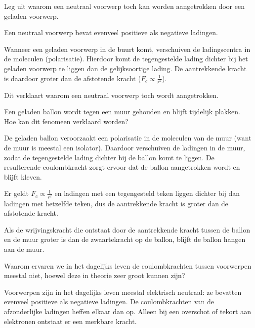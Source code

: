 \documentclass{ximera}
\begin{document}
\begin{question}
    Leg uit waarom een neutraal voorwerp toch kan worden aangetrokken door een geladen voorwerp.

    \begin{solution}\nl
        Een neutraal voorwerp bevat evenveel positieve als negatieve ladingen.

        Wanneer een geladen voorwerp in de buurt komt, verschuiven de ladingscentra in de moleculen (polarisatie). Hierdoor komt de tegengestelde lading dichter bij het geladen voorwerp te liggen dan de gelijksoortige lading. De aantrekkende kracht is daardoor groter dan de afstotende kracht ($F_{c}\propto \tfrac{1}{r^{2}} $).

        Dit verklaart waarom een neutraal voorwerp toch wordt aangetrokken.\\
    \end{solution}
\end{question}

\begin{question}
    Een geladen ballon wordt tegen een muur gehouden en blijft tijdelijk plakken. Hoe kan dit fenomeen verklaard worden?

    \begin{solution}\nl
        De geladen ballon veroorzaakt een polarisatie in de moleculen van de muur (want de muur is meestal een isolator). Daardoor verschuiven de ladingen in de muur, zodat de tegengestelde lading dichter bij de ballon komt te liggen. De resulterende coulombkracht zorgt ervoor dat de ballon aangetrokken wordt en blijft kleven.

        Er geldt $F_{c}\propto \tfrac{1}{r^{2}} $ en ladingen met een tegengesteld teken liggen dichter bij dan ladingen met hetzelfde teken, dus de aantrekkende kracht is groter dan de afstotende kracht.

        Als de wrijvingskracht die ontstaat door de aantrekkende kracht tussen de ballon en de muur groter is dan de zwaartekracht op de ballon, blijft de ballon hangen aan de muur.
    \end{solution}
\end{question}

\begin{question}
    Waarom ervaren we in het dagelijks leven de coulombkrachten tussen voorwerpen meestal niet, hoewel deze in theorie zeer groot kunnen zijn?

    \begin{solution}\nl
        Voorwerpen zijn in het dagelijks leven meestal elektrisch neutraal: ze bevatten evenveel positieve als negatieve ladingen. De coulombkrachten van de afzonderlijke ladingen heffen elkaar dan op. Alleen bij een overschot of tekort aan elektronen ontstaat er een merkbare kracht.\\
    \end{solution}
\end{question}
\end{document}

